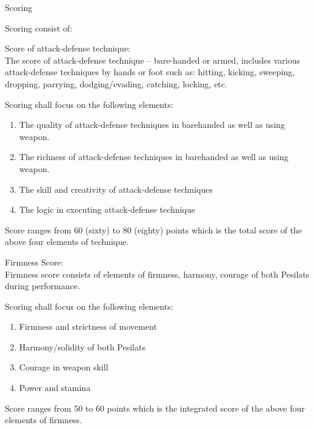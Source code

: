 \begin{legal}
\begin{legal}
    \end{legal}

\item Scoring
    \begin{legal}
    \item Scoring consist of:
        \begin{legal}
        \item Score of attack-defense technique:\\
            The score of attack-defense technique – bare-handed or armed, includes various attack-defense 
            techniques by hands or foot such as: hitting, kicking, sweeping, dropping, parrying, 
            dodging/evading, catching, locking, etc.

        Scoring shall focus on the following elements:

        \begin{enumerate}[label=\alph*.]
        \item The quality of attack-defense techniques in barehanded as well as using weapon.
        \item The richness of attack-defense techniques in barehanded as well as using weapon.
        \item The skill and creativity of attack-defense techniques
        \item The logic in executing attack-defense technique
        \end{enumerate}

        Score ranges from 60 (sixty) to 80 (eighty) points which is the total score of the above four elements of technique.

        \item Firmness Score: \\
        Firmness score consists of elements of firmness, harmony, courage of both Pesilats during performance.

        Scoring shall focus on the following elements:

            \begin{enumerate}[label=\alph*.]
            \item Firmness and strictness of movement
            \item Harmony/solidity of both Pesilats
            \item Courage in weapon skill
            \item Power and stamina
            \end{enumerate}

        Score ranges from 50 to 60 points which is the integrated score of the above four elements of firmness.


\end{legal}
\end{legal}
\end{legal}
